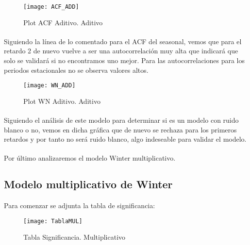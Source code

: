 \documentclass[a4paper, spanish]{article}
\begin{document}
      \begin{figure}[h]
        \centering
        \texttt{[image: ACF\_ADD]}
        \caption{Plot ACF Aditivo. Aditivo}
        \label{}
      \end{figure}

      \paragraph{}
      Siguiendo la línea de lo comentado para el ACF del seasonal, vemos que para el retardo 2 de nuevo vuelve a ser una autocorrelación muy alta que indicará que solo se validará si no encontramos uno mejor. Para las autocorrelaciones para los periodos estacionales no se observa valores altos.

      \begin{figure}[h]
        \centering
        \texttt{[image: WN\_ADD]}
        \caption{Plot WN Aditivo. Aditivo}
        \label{}
      \end{figure}

      \paragraph{}
      Siguiendo el análisis de este modelo para determinar si es un modelo con ruido blanco o no, vemos en dicha gráfica que de nuevo se rechaza para los primeros retardos y por tanto no será ruido blanco, algo indeseable para validar el modelo.

      \paragraph{}
      Por último analizaremos el modelo Winter multiplicativo.

    \subsection{Modelo multiplicativo de Winter}

      \paragraph{}
      Para comenzar se adjunta la tabla de significancia:

      \begin{figure}[h]
        \centering
        \texttt{[image: TablaMUL]}
        \caption{Tabla Significancia. Multiplicativo}
        \label{}
      \end{figure}
\end{document}
